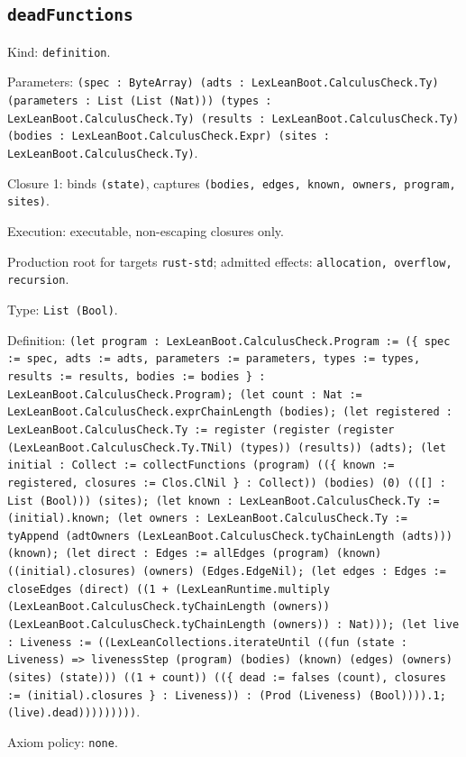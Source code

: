 \documentclass[11pt]{article}
\begin{document}
\subsection*{\texttt{deadFunctions}}
\noindent Kind: \texttt{definition}.\par
\noindent Parameters: \texttt{(spec : ByteArray) (adts : LexLeanBoot.CalculusCheck.Ty) (parameters : List (List (Nat))) (types : LexLeanBoot.CalculusCheck.Ty) (results : LexLeanBoot.CalculusCheck.Ty) (bodies : LexLeanBoot.CalculusCheck.Expr) (sites : LexLeanBoot.CalculusCheck.Ty)}.\par
\noindent Closure 1: binds \texttt{(state)}, captures \texttt{(bodies, edges, known, owners, program, sites)}.\par
\noindent Execution: executable, non-escaping closures only.\par
\noindent Production root for targets \texttt{rust-std}; admitted effects: \texttt{allocation, overflow, recursion}.\par
\noindent Type: \texttt{List (Bool)}.\par
\noindent Definition: \texttt{(let program : LexLeanBoot.CalculusCheck.Program := (\{ spec := spec, adts := adts, parameters := parameters, types := types, results := results, bodies := bodies \} : LexLeanBoot.CalculusCheck.Program); (let count : Nat := LexLeanBoot.CalculusCheck.exprChainLength (bodies); (let registered : LexLeanBoot.CalculusCheck.Ty := register (register (register (LexLeanBoot.CalculusCheck.Ty.TNil) (types)) (results)) (adts); (let initial : Collect := collectFunctions (program) ((\{ known := registered, closures := Clos.ClNil \} : Collect)) (bodies) (0) (([] : List (Bool))) (sites); (let known : LexLeanBoot.CalculusCheck.Ty := (initial).known; (let owners : LexLeanBoot.CalculusCheck.Ty := tyAppend (adtOwners (LexLeanBoot.CalculusCheck.tyChainLength (adts))) (known); (let direct : Edges := allEdges (program) (known) ((initial).closures) (owners) (Edges.EdgeNil); (let edges : Edges := closeEdges (direct) ((1 + (LexLeanRuntime.multiply (LexLeanBoot.CalculusCheck.tyChainLength (owners)) (LexLeanBoot.CalculusCheck.tyChainLength (owners)) : Nat))); (let live : Liveness := ((LexLeanCollections.iterateUntil ((fun (state : Liveness) => livenessStep (program) (bodies) (known) (edges) (owners) (sites) (state))) ((1 + count)) ((\{ dead := falses (count), closures := (initial).closures \} : Liveness)) : (Prod (Liveness) (Bool)))).1; (live).dead)))))))))}.\par
\noindent Axiom policy: \texttt{none}.\par
\end{document}
